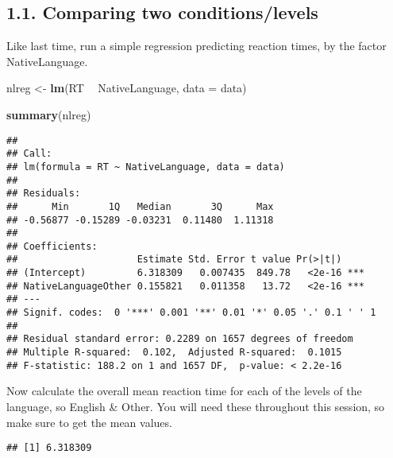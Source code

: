 \documentclass[
]{article}
\newenvironment{Shaded}{\begin{snugshade}}{\end{snugshade}}
\newcommand{\DataTypeTok}[1]{\textcolor[rgb]{0.13,0.29,0.53}{#1}}
\newcommand{\KeywordTok}[1]{\textcolor[rgb]{0.13,0.29,0.53}{\textbf{#1}}}
\newcommand{\NormalTok}[1]{#1}
\newcommand{\OperatorTok}[1]{\textcolor[rgb]{0.81,0.36,0.00}{\textbf{#1}}}
\newcommand{\StringTok}[1]{\textcolor[rgb]{0.31,0.60,0.02}{#1}}
\begin{document}
\hypertarget{comparing-two-conditionslevels}{%
\subsection{1.1. Comparing two
conditions/levels}\label{comparing-two-conditionslevels}}

Like last time, run a simple regression predicting reaction times, by
the factor NativeLanguage.

\begin{Shaded}
\begin{Highlighting}[]
\NormalTok{nlreg <-}\StringTok{ }\KeywordTok{lm}\NormalTok{(RT }\OperatorTok{~}\StringTok{ }\NormalTok{NativeLanguage, }\DataTypeTok{data =}\NormalTok{ data)}

\KeywordTok{summary}\NormalTok{(nlreg)}
\end{Highlighting}
\end{Shaded}

\begin{verbatim}
## 
## Call:
## lm(formula = RT ~ NativeLanguage, data = data)
## 
## Residuals:
##      Min       1Q   Median       3Q      Max 
## -0.56877 -0.15289 -0.03231  0.11480  1.11318 
## 
## Coefficients:
##                     Estimate Std. Error t value Pr(>|t|)    
## (Intercept)         6.318309   0.007435  849.78   <2e-16 ***
## NativeLanguageOther 0.155821   0.011358   13.72   <2e-16 ***
## ---
## Signif. codes:  0 '***' 0.001 '**' 0.01 '*' 0.05 '.' 0.1 ' ' 1
## 
## Residual standard error: 0.2289 on 1657 degrees of freedom
## Multiple R-squared:  0.102,  Adjusted R-squared:  0.1015 
## F-statistic: 188.2 on 1 and 1657 DF,  p-value: < 2.2e-16
\end{verbatim}

Now calculate the overall mean reaction time for each of the levels of
the language, so English \& Other. You will need these throughout this
session, so make sure to get the mean values.

\begin{Shaded}
\end{Shaded}

\begin{verbatim}
## [1] 6.318309
\end{verbatim}
\end{document}
